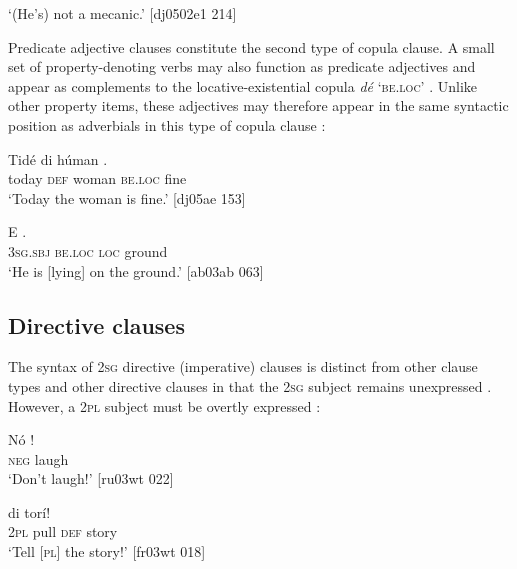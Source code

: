 \glt ‘(He’s) not a mecanic.’ [dj0502e1 214]
\z

Predicate adjective clauses constitute the second type of copula clause. A small set of property-denoting verbs may also function as predicate adjectives and appear as complements to the locative-existential copula \textit{dé} \textsc{‘be.loc’} \textsc{}. Unlike other property items, these adjectives may therefore appear in the same syntactic position as adverbials in this type of copula clause \textsc{}: 


\ea%
    \label{ex:key:526}
    \gll Tidé    di  húman     .\\
today  \textsc{def}  woman  \textsc{be.loc}  fine\\

\glt ‘Today the woman is fine.’ [dj05ae 153]
\z


\ea%
    \label{ex:key:527}
    \gll E         .\\
\textsc{3sg.sbj}  \textsc{be.loc}  \textsc{loc}  ground\\

\glt ‘He is [lying] on the ground.’ [ab03ab 063]
\z

\subsection{Directive clauses}

The syntax of \textsc{2sg} directive (imperative) clauses is distinct from other clause types and other directive clauses in that the \textsc{2sg} subject remains unexpressed . However, a \textsc{2pl} subject must be overtly expressed :


\ea%
    \label{ex:key:528}
    \gll Nó  !\\
\textsc{neg}  laugh\\

\glt ‘Don’t laugh!’ [ru03wt 022]
\z


\ea%
    \label{ex:key:529}
    \gll {}     di  torí!\\
\textsc{2pl}    pull  \textsc{def}  story\\

\glt ‘Tell \textsc{[pl]} the story!’ [fr03wt 018]
\z

